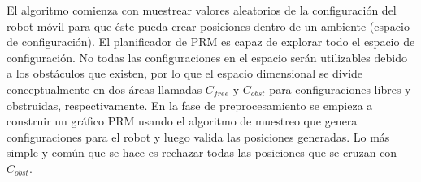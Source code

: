 El algoritmo comienza con muestrear valores aleatorios de la configuración del 
robot móvil para que éste pueda crear posiciones dentro de un ambiente (espacio
de configuración). El planificador de PRM es capaz de explorar todo el 
espacio de configuración. No todas las configuraciones en el espacio serán
utilizables debido a los obstáculos que existen, por lo que el espacio
dimensional se divide conceptualmente en dos áreas llamadas $C_{free}$ y
$C_{obst}$ para configuraciones libres y obstruidas, respectivamente. En la
fase de preprocesamiento se empieza a construir un gráfico PRM usando el 
algoritmo de muestreo que genera configuraciones para el
robot y luego valida las posiciones generadas. Lo más simple y común que 
se hace es rechazar todas las posiciones que se cruzan con $C_{obst}$.




